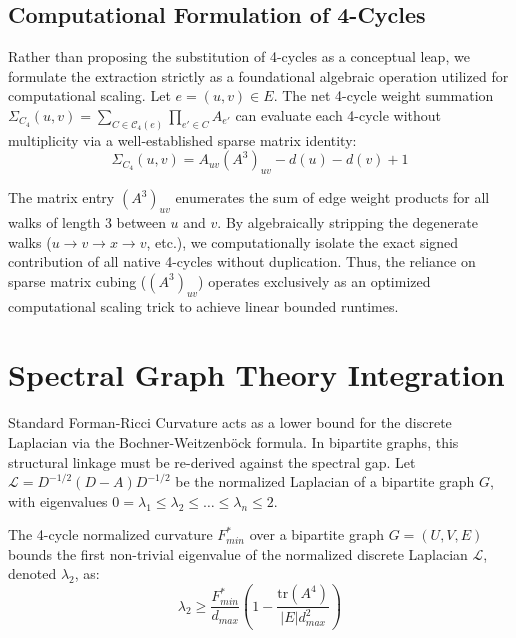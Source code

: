 \documentclass{siuro250211}
\begin{document}
\subsection{Computational Formulation of 4-Cycles}
Rather than proposing the substitution of 4-cycles as a conceptual leap, we formulate the extraction strictly as a foundational algebraic operation utilized for computational scaling. Let $e = (u,v) \in E$. The net 4-cycle weight summation $\Sigma_{C_4}(u,v) = \sum_{C \in \mathcal{C}_4(e)} \prod_{e' \in C} A_{e'}$ can evaluate each 4-cycle without multiplicity via a well-established sparse matrix identity:
\begin{equation}
\label{eq:sigma_c4}
\Sigma_{C_4}(u,v) = A_{uv} (A^3)_{uv} - d(u) - d(v) + 1
\end{equation}

The matrix entry $(A^3)_{uv}$ enumerates the sum of edge weight products for all walks of length 3 between $u$ and $v$. By algebraically stripping the degenerate walks ($u \to v \to x \to v$, etc.), we computationally isolate the exact signed contribution of all native 4-cycles without duplication. Thus, the reliance on sparse matrix cubing ($(A^3)_{uv}$) operates exclusively as an optimized computational scaling trick to achieve linear bounded runtimes.

\section{Spectral Graph Theory Integration}

Standard Forman-Ricci Curvature acts as a lower bound for the discrete Laplacian via the Bochner-Weitzenb{\"o}ck formula. In bipartite graphs, this structural linkage must be re-derived against the spectral gap. Let $\mathcal{L} = D^{-1/2}(D - A)D^{-1/2}$ be the normalized Laplacian of a bipartite graph $G$, with eigenvalues $0 = \lambda_1 \le \lambda_2 \le \dots \le \lambda_n \le 2$.

\begin{proposition}
\label{thm:spectralgap}
The 4-cycle normalized curvature $F_{min}^*$ over a bipartite graph $G = (U, V, E)$ bounds the first non-trivial eigenvalue of the normalized discrete Laplacian $\mathcal{L}$, denoted $\lambda_2$, as:
\begin{equation}
\lambda_2 \ge \frac{F_{min}^*}{d_{max}} \left( 1 - \frac{\text{tr}(A^4)}{|E| d_{max}^2} \right)
\end{equation}
\end{proposition}
\end{document}
